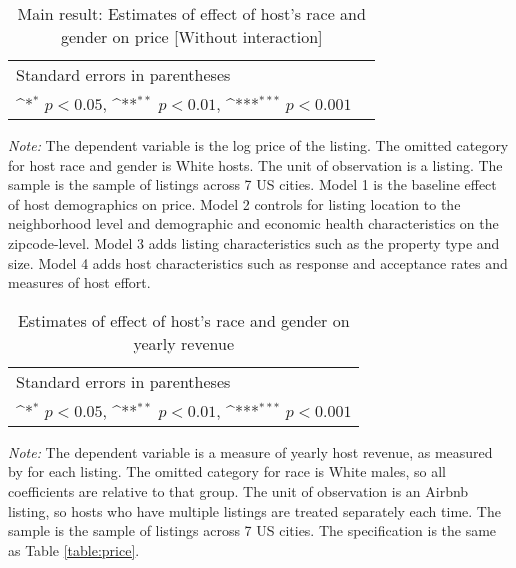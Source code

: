 \begin{table}[htbp]\centering
	\def\sym#1{\ifmmode^{#1}\else\(^{#1}\)\fi}
	\caption{Main result: Estimates of effect of host’s race and gender on price [Without interaction]}
	\begin{tabular}{l*{5}{c}}
		\hline\hline
		
		\hline\hline
		\multicolumn{5}{l}{\footnotesize Standard errors in parentheses}\\
		\multicolumn{5}{l}{\footnotesize \sym{*} \(p<0.05\), \sym{**} \(p<0.01\), \sym{***} \(p<0.001\)}\\
	\end{tabular}
	\label{table:price_no_int}
	\begin{tablenotes}
		
		\item {\it Note:} The dependent variable is the log price of the listing. The omitted category for host race and gender is White hosts. The unit of observation is a listing. The sample is the sample of listings across 7 US cities. Model 1 is the baseline effect of host demographics on price. Model 2 controls for listing location to the neighborhood level and demographic and economic health characteristics on the zipcode-level. Model 3 adds listing characteristics such as the property type and size. Model 4 adds host characteristics such as response and acceptance rates and measures of host effort.  
	\end{tablenotes}
\end{table}


\begin{table}[htbp]\centering
	\def\sym#1{\ifmmode^{#1}\else\(^{#1}\)\fi}
	\caption{Estimates of effect of host's race and gender on yearly revenue}
	\begin{tabular}{l*{4}{c}}
		\hline\hline
		
		\hline\hline
		\multicolumn{5}{l}{\footnotesize Standard errors in parentheses}\\
		\multicolumn{5}{l}{\footnotesize \sym{*} \(p<0.05\), \sym{**} \(p<0.01\), \sym{***} \(p<0.001\)}\\
	\end{tabular}
	\label{revenue}
	\begin{tablenotes}
		\item {\it Note:} The dependent variable is a measure of yearly host revenue, as measured by for each listing. The omitted category for race is White males, so all coefficients are relative to that group. The unit of observation is an Airbnb listing, so hosts who have multiple listings are treated separately each time. The sample is the sample of listings across 7 US cities. The specification is the same as Table \ref{table:price}.
	\end{tablenotes}
\end{table}



















